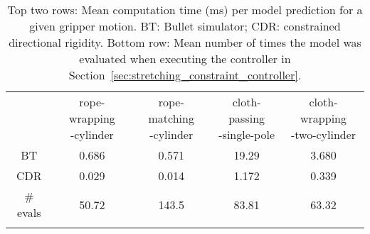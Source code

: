 \begin{table}[h]
\centering
\caption{Top two rows: Mean computation time (ms) per model prediction for a given gripper motion. BT: Bullet simulator; CDR: constrained directional rigidity. Bottom row: Mean number of times the model was evaluated when executing the controller in Section~\ref{sec:stretching_constraint_controller}.}
\label{tbl:simulation_time_report}
\begin{tabular}{ccccc}
\hline\noalign{\smallskip}
            & \makecell{rope-wrapping\\-cylinder} 
            & \makecell{rope-matching\\-cylinder}
            & \makecell{cloth-passing\\-single-pole}
            & \makecell{cloth-wrapping\\-two-cylinder} \\
\noalign{\smallskip}\hline\noalign{\smallskip}
BT          & 0.686 & 0.571 & 19.29 & 3.680 \\
CDR         & 0.029 & 0.014 & 1.172 & 0.339 \\
\noalign{\smallskip}\hline\noalign{\smallskip}
\# evals    & 50.72 & 143.5 & 83.81 & 63.32 \\
\noalign{\smallskip}\hline
\end{tabular}
\end{table}
